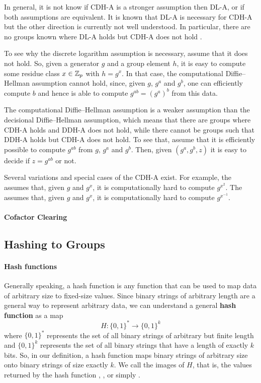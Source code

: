 In general, it is not know if CDH-A is a stronger assumption then DL-A, or if both assumptions are equivalent. It is known that DL-A is necessary for CDH-A but the other direction is currently not well understood. In particular, there are no groups known where DL-A holds but CDH-A does not hold \citep{Fifield12theequivalence}.

To see why the discrete logarithm assumption is necessary, assume that it does not hold. So, given a generator $g$ and a group element $h$, it is easy to compute some residue class $x\in\mathbb{Z}_p$ with $h=g^x$. In that case, the computational Diffie--Hellman assumption cannot hold, since, given $g$, $g^a$ and $g^b$, one can efficiently compute $b$ and hence is able to compute $g^{ab}=(g^a)^b$ from this data.

The computational Diffie--Hellman assumption is a weaker assumption than the decisional  Diffie--Hellman assumption, which means that there are groups where CDH-A holds and DDH-A does not hold, while there cannot be groups such that DDH-A holds but CDH-A does not hold. To see that, assume that it is efficiently possible to compute $g^{ab}$ from $g$, $g^a$ and $g^b$. Then, given $(g^a,g^b,z)$ it is easy to decide if $z=g^{ab}$ or not. 

Several variations and special cases of the CDH-A exist. For example, the  assumes that, given $g$ and $g^x$, it is computationally hard to compute $g^{x^2}$. The  assumes that, given $g$ and $g^x$, it is computationally hard to compute $g^{x^{-1}}$. 

\paragraph{Cofactor Clearing}
\subsection{Hashing to Groups}
\paragraph{Hash functions} Generally speaking, a hash function is any function that can be used to map data of arbitrary size to fixed-size values. Since binary strings of arbitrary length are a general way to represent arbitrary data, we can understand a general \textbf{hash function} as a map 
\begin{equation}
H: \{0,1\}^* \to \{0,1\}^k
\end{equation}
where $\{0,1\}^*$ represents the set of all binary strings of arbitrary but finite length and $\{0,1\}^k$ represents the set of all binary strings that have a length of exactly $k$ bits. So, in our definition, a hash function maps binary strings of arbitrary size onto binary strings of size exactly $k$. We call the images of $H$, that is, the values returned by the hash function , , or simply .


